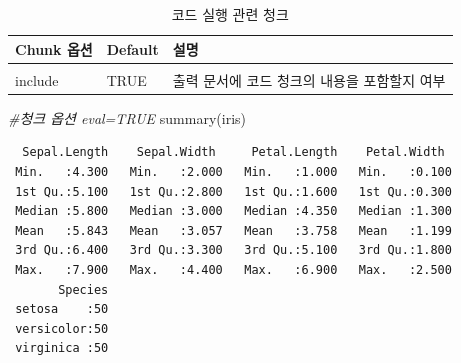 \documentclass[
  11pt,
]{krantz}
\newenvironment{Shaded}{\begin{snugshade}}{\end{snugshade}}
\newcommand{\CommentTok}[1]{\textcolor[rgb]{0.37,0.37,0.37}{\textit{#1}}}
\newcommand{\FunctionTok}[1]{\textcolor[rgb]{0,0,0}{#1}}
\newcommand{\InformationTok}[1]{\textcolor[rgb]{0.37,0.37,0.37}{\textbf{\textit{#1}}}}
\newcommand{\NormalTok}[1]{#1}
\begin{document}
\begin{table}[H]

\caption{\label{tab:chunk-tab-01}코드 실행 관련 청크}
\centering
\fontsize{14}{16}\selectfont
\begin{tabular}[t]{>{\raggedright\arraybackslash}p{3cm}>{\raggedright\arraybackslash}p{3cm}>{\raggedright\arraybackslash}p{8cm}}
\toprule
Chunk 옵션 & Default & 설명\\
\midrule
\cellcolor{gray!6}{eval} & \cellcolor{gray!6}{TRUE} & \cellcolor{gray!6}{R 실행(코드 실행 결과)에 대응하는 결과 출력 여부}\\
include & TRUE & 출력 문서에 코드 청크의 내용을 포함할지 여부\\
\bottomrule
\end{tabular}
\end{table}

\normalsize

\begin{Shaded}
\end{Shaded}

\footnotesize

\begin{Shaded}
\begin{Highlighting}[]
\CommentTok{\#청크 옵션 eval=TRUE}
\FunctionTok{summary}\NormalTok{(iris)}
\end{Highlighting}
\end{Shaded}

\begin{verbatim}
  Sepal.Length    Sepal.Width     Petal.Length    Petal.Width   
 Min.   :4.300   Min.   :2.000   Min.   :1.000   Min.   :0.100  
 1st Qu.:5.100   1st Qu.:2.800   1st Qu.:1.600   1st Qu.:0.300  
 Median :5.800   Median :3.000   Median :4.350   Median :1.300  
 Mean   :5.843   Mean   :3.057   Mean   :3.758   Mean   :1.199  
 3rd Qu.:6.400   3rd Qu.:3.300   3rd Qu.:5.100   3rd Qu.:1.800  
 Max.   :7.900   Max.   :4.400   Max.   :6.900   Max.   :2.500  
       Species  
 setosa    :50  
 versicolor:50  
 virginica :50  
                
                
                
\end{verbatim}
\end{document}

